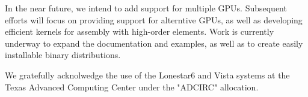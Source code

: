 In the near future, we intend to add support for multiple GPUs. Subsequent efforts will focus on providing support for alterntive GPUs, as well as developing efficient kernels for assembly with high-order elements. Work is currently underway to expand the documentation and examples, as well as to create easily installable binary distributions.



\begin{acknowledgement}
  We gratefully acknolwedge the use of the Lonestar6 and Vista systems at the Texas Advanced Computing Center under the "ADCIRC" allocation.        
\end{acknowledgement}





